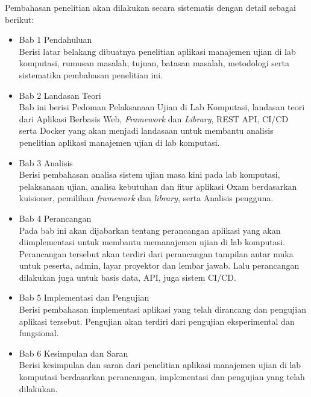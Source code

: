 Pembahasan penelitian akan dilakukan secara sistematis dengan detail sebagai
berikut:

\begin{itemize}
    \item Bab 1 Pendahuluan \\
        Berisi latar belakang dibuatnya penelitian aplikasi manajemen ujian di lab komputasi, 
        rumusan masalah, tujuan, batasan masalah, metodologi serta sistematika pembahasan penelitian ini.
    
    \item Bab 2 Landasan Teori \\
        Bab ini berisi Pedoman Pelaksanaan Ujian di Lab Komputasi, landasan
        teori dari Aplikasi Berbasis Web, \textit{Framework} dan
        \textit{Library}, REST API, CI/CD serta Docker yang akan menjadi
        landasaan untuk membantu analisis penelitian aplikasi manajemen ujian di
        lab komputasi.
        
    \item Bab 3 Analisis \\
        Berisi pembahasan analisa sistem ujian masa kini pada lab komputasi,
        pelaksanaan ujian, analisa kebutuhan dan fitur aplikasi Oxam berdasarkan
        kuisioner, pemilihan \textit{framework} dan \textit{library}, serta
        Analisis pengguna.
        
    \item Bab 4 Perancangan \\
        Pada bab ini akan dijabarkan tentang perancangan aplikasi yang akan
        diimplementasi untuk membantu memanajemen ujian di lab komputasi.
        Perancangan tersebut akan terdiri dari perancangan tampilan antar muka
        untuk peserta, admin, layar proyektor dan lembar jawab. Lalu perancangan
        dilakukan juga untuk basis data, API, juga sistem CI/CD.
    
    \item Bab 5 Implementasi dan Pengujian \\
        Berisi pembahasan implementasi aplikasi yang telah dirancang dan
        pengujian aplikasi tersebut. Pengujian akan terdiri dari pengujian
        eksperimental dan fungsional.
        
    \item Bab 6 Kesimpulan dan Saran \\
        Berisi kesimpulan dan saran dari penelitian aplikasi manajemen ujian di
        lab komputasi berdasarkan perancangan, implementasi dan pengujian yang
        telah dilakukan.
\end{itemize}